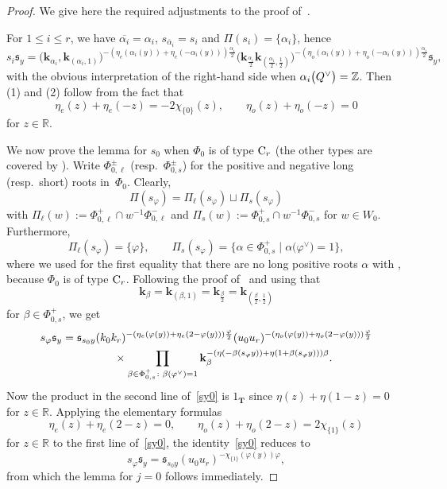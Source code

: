\documentclass[pdftex]{sigma}
\numberwithin{equation}{section}
\begin{document}
\begin{proof}
We give here the required adjustments to the proof of~\cite[Lemma~5.3]{SSV2}.

For $1\leq i\leq r$, we have $\overline{\alpha_i}=\alpha_i$, $s_{\overline{\alpha}_i}=s_i$ and $\Pi(s_i)=\{\alpha_i\}$, hence
\[
s_i\mathfrak{s}_y=\bigl(\mathbf{k}_{\alpha_i},\mathbf{k}_{(\alpha_i,1)}\bigr)^{-(\eta_e(\alpha_i(y))+\eta_e(-\alpha_i(y)))\frac{\alpha_i}{2}}
\bigl(\mathbf{k}_{\frac{\alpha_i}{2}}\mathbf{k}_{(\frac{\alpha_i}{2},\frac{1}{2})}\bigr)^{-(\eta_o(\alpha_i(y))+\eta_o(-\alpha_i(y)))\frac{\alpha_i}{2}}
\mathfrak{s}_y,
\]
with the obvious interpretation of the right-hand side when $\alpha_i\smash{\bigl(Q^\vee\bigr)}=\mathbb{Z}$. Then (1) and (2) follow from the fact that
\[
\eta_e(z)+\eta_e(-z)=-2\chi_{\{0\}}(z),\qquad \eta_o(z)+\eta_o(-z)=0
\]
for $z\in\mathbb{R}$.

We now prove the lemma for $s_0$ when $\Phi_0$ is of type ${\rm C}_r$ (the other types are covered by
\cite[Lemma~5.3]{SSV2}). Write $\Phi_{0,\ell}^{\pm}$ \big(resp.\ $\Phi_{0,s}^{\pm}$\big) for the positive and negative long (resp.\ short) roots in~$\Phi_0$. Clearly,
\[
\Pi(s_\varphi)=\Pi_\ell(s_\varphi)\sqcup\Pi_s(s_\varphi)
\]
with $\Pi_\ell(w):=\Phi_{0,\ell}^+\cap w^{-1}\Phi_{0,\ell}^-$ and $\Pi_s(w):=\Phi_{0,s}^+\cap w^{-1}\Phi_{0,s}^-$ for $w\in W_0$. Furthermore,
\[
\Pi_\ell(s_\varphi)=\{\varphi\},\qquad \Pi_s(s_\varphi)=\bigl\{\alpha\in\Phi_{0,s}^+\mid \alpha\bigl(\varphi^\vee\bigr)=1\bigr\},
\]
where we used for the first equality that there are no long positive roots $\alpha$ with , because
$\Phi_0$ is of type ${\rm C}_r$. Following the proof of~\cite[Lemma~5.3]{SSV2} and using that
\[
\mathbf{k}_\beta=\mathbf{k}_{(\beta,1)}=\mathbf{k}_{\frac{\beta}{2}}=\mathbf{k}_{(\frac{\beta}{2},\frac{1}{2})}
\]
for $\beta\in\Phi_{0,s}^+$, we get
\begin{gather}
s_\varphi\mathfrak{s}_y=\mathfrak{s}_{s_0y}(k_0k_r)^{-(\eta_e(\varphi(y))+\eta_e(2-\varphi(y)))\frac{\varphi}{2}}
(u_0u_r)^{-(\eta_o(\varphi(y))+\eta_o(2-\varphi(y)))\frac{\varphi}{2}} \nonumber\\
\hphantom{s_\varphi\mathfrak{s}_y=}{}
\times\prod_{\beta\in\Phi_{0,s}^+\colon \beta(\varphi^\vee)=1}
\mathbf{k}_\beta^{-(\eta(-\beta(s_\varphi y))+\eta(1+\beta(s_\varphi y)))\beta}.\label{sy0}
\end{gather}
Now the product in the second line of~\eqref{sy0} is $1_{\mathbf{T}}$ since $\eta(z)+\eta(1-z)=0$ for $z\in\mathbb{R}$. Applying the elementary formulas
\begin{equation}\label{els0}
\eta_e(z)+\eta_e(2-z)=0,\qquad \eta_o(z)+\eta_o(2-z)=2\chi_{\{1\}}(z)
\end{equation}
for $z\in\mathbb{R}$ to the first line of~\eqref{sy0}, the identity~\eqref{sy0} reduces to
\[
s_\varphi\mathfrak{s}_y=\mathfrak{s}_{s_0y}(u_0u_r)^{-\chi_{\{1\}}(\varphi(y))\varphi},
\]
from which the lemma for $j=0$ follows immediately.
\end{proof}
\end{document}
